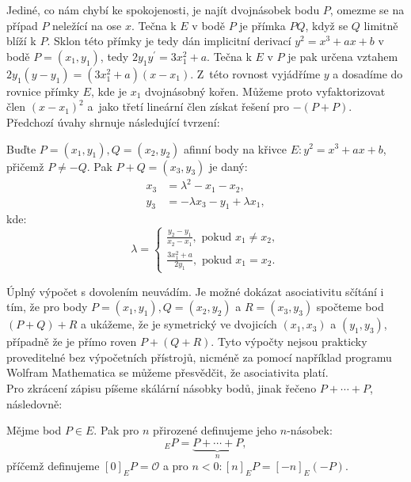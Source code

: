 \documentclass [12pt]{report}
\begin{document}
Jediné, co nám chybí ke spokojenosti, je najít dvojnásobek bodu $P$, omezme se na případ $P$ neležící na ose $x$. Tečna k $E$ v bodě $P$ je přímka $PQ$, když se $Q$ limitně blíží k $P$. Sklon této přímky je tedy dán implicitní derivací $y^2 = x^3+ax+b$ v bodě $P = (x_1,y_1)$, tedy $2 y_1 y^\prime =3x_1 ^2 + a$. Tečna k $E$ v $P$ je pak určena vztahem $2y_1(y-y_1) = (3x_1 ^2+a)(x-x_1)$. Z~této rovnost vyjádříme $y$ a dosadíme do rovnice přímky $E$, kde je $x_1$ dvojnásobný kořen. Můžeme proto vyfaktorizovat člen $(x-x_1)^2$ a~jako třetí lineární člen získat řešení pro $-(P+P)$.\\

Předchozí úvahy shrnuje následující tvrzení:

\begin{veta}\label{sum}
Buďte $P = (x_1,y_1), Q = (x_2,y_2)$ afinní body na křivce $E : y^2 = x^3+ax+b$, přičemž $P \neq -Q$. Pak $P+Q = (x_3,y_3)$ je daný:
\begin{align*}
x_3 &= \lambda^2 - x_1 - x_2,\\
y_3 &= - \lambda x_3 - y_1 + \lambda x_1,
\end{align*}
kde:
\begin{equation*}
\lambda = \begin{cases}
\frac{y_2 - y_1}{x_2-x_1}, \text{ pokud } x_1 \neq x_2,\\
\frac{3x_1 ^2 + a}{2y_1}, \text{ pokud } x_1 = x_2.
\end{cases}
\end{equation*}

\end{veta}
Úplný výpočet s dovolením neuvádím. Je možné dokázat asociativitu sčítání i tím, že pro body $P = (x_1,y_1), Q = (x_2,y_2)$ a $R = (x_3,y_3)$ spočteme bod $(P+Q)+R$ a ukážeme, že je symetrický ve dvojicích $(x_1,x_3)$ a $(y_1,y_3)$, případně že je přímo roven $P+(Q+R)$. Tyto výpočty nejsou prakticky proveditelné bez výpočetních přístrojů, nicméně za pomocí například programu Wolfram Mathematica se můžeme přesvědčit, že asociativita platí.\\

Pro zkrácení zápisu píšeme skálární násobky bodů, jinak řečeno $P+\cdots+P$, následovně:

\begin{definice}
Mějme bod $P \in E$. Pak pro $n$ přirozené definujeme jeho $n$-násobek:
\begin{equation*}
[n]_E P = \underbrace{P+ \cdots + P}_{n},
\end{equation*}
příčemž definujeme $[0]_E P = \mathcal{O}$ a pro $n < 0: [n]_E P = [-n]_E (-P)$.
\end{definice}
\end{document}
